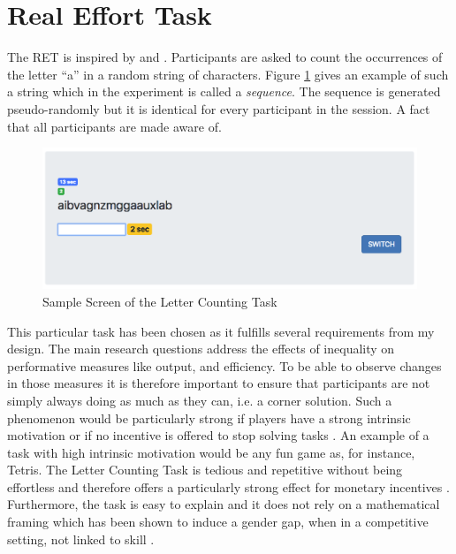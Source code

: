     
    \section{Real Effort Task}
    \label{sec:RET}
    
    The RET is inspired by \cite{rey-biel2016} and \cite{giusti2014}. Participants are asked to count the occurrences of the letter ``a'' in a random string of characters. Figure \ref{fig:LC_screen} gives an example of such a string which in the experiment is called a \textit{sequence}. The sequence is generated pseudo-randomly but it is identical for every participant in the session. A fact that all participants are made aware of.\\ 
    
    \begin{figure}
        \centering
        \includegraphics[width=\textwidth]{graphs/screenshot_RET_alone.png}
        \caption{Sample Screen of the Letter Counting Task}
        \label{fig:LC_screen}
    \end{figure}
    
    This particular task has been chosen as it fulfills several requirements from my design. The main research questions address the effects of inequality on performative measures like output, and efficiency. To be able to observe changes in those measures it is therefore important to ensure that participants are not simply always doing as much as they can, i.e. a corner solution. Such a phenomenon would be particularly strong if players have a strong intrinsic motivation or if no incentive is offered to stop solving tasks \citep{frey1997}. An example of a task with high intrinsic motivation would be any fun game as, for instance, Tetris.
    The Letter Counting Task is tedious and repetitive without being effortless and therefore offers a particularly strong effect for monetary incentives \citep{cerasoli2014}.\\
    
    Furthermore, the task is easy to explain and it does not rely on a mathematical framing which has been shown to induce a gender gap, when in a competitive setting, not linked to skill \citep{niederle2010}.\\ 
    
